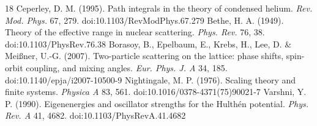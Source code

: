 \documentclass[10pt,letterpaper]{article}
\begin{document}
\begin{thebibliography}{18}
 Ceperley, D. M. (1995). Path integrals in the theory of condensed helium. \textit{Rev. Mod. Phys.} 67, 279. doi:10.1103/RevModPhys.67.279
 Bethe, H. A. (1949). Theory of the effective range in nuclear scattering. \textit{Phys. Rev.} 76, 38. doi:10.1103/PhysRev.76.38
 Borasoy, B., Epelbaum, E., Krebs, H., Lee, D. \& Meißner, U.-G. (2007). Two-particle scattering on the lattice: phase shifts, spin-orbit coupling, and mixing angles. \textit{Eur. Phys. J. A} 34, 185. doi:10.1140/epja/i2007-10500-9
 Nightingale, M. P. (1976). Scaling theory and finite systems. \textit{Physica A} 83, 561. doi:10.1016/0378-4371(75)90021-7
 Varshni, Y. P. (1990). Eigenenergies and oscillator strengths for the Hulthén potential. \textit{Phys. Rev. A} 41, 4682. doi:10.1103/PhysRevA.41.4682
\end{thebibliography}
\endgroup
\end{document}
